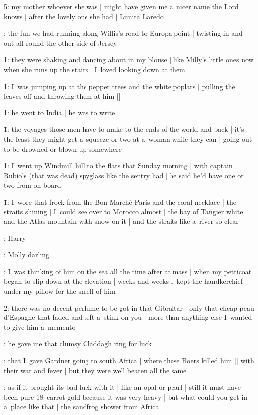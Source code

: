 \f5:
my mother whoever she was |
might have given me a~nicer name the Lord knows |
after the lovely one she had |
Lunita Laredo

:
the fun we had running along Willis's road to Europa point |
twisting in and out all round the other side of Jersey

\f1:
they were shaking and dancing about in my blouse |
like Milly's little ones now when she runs up the stairs |
I~loved looking down at them

\f1:
I~was jumping up at the pepper trees and the white poplars |
pulling the leaves off and throwing them at him [\mulvey]

\f1:
he went to India |
he was to write

\f1:
the voyages those men have to make to the ends of the world and back |
it's the least they might get a~squeeze or two at a~woman while they can |
going out to be drowned or blown up somewhere

\f1:
I~went up Windmill hill to the flats that Sunday morning |
with captain Rubio's (that was dead) spyglass like the sentry had |
he said he'd have one or two from on board

\f1:
I~wore that frock from the Bon Marché Paris and the coral necklace |
the straits shining |
I~could see over to Morocco almost |
the bay of Tangier white and the Atlas mountain with snow on it |
and the straits like a~river so clear

:
Harry

:
Molly darling

:
I~was thinking of him on the sea all the time after at mass |
when my petticoat began to slip down at the elevation |
weeks and weeks I~kept the handkerchief under my pillow for the smell of him

\f2:
there was no decent perfume to be got in that Gibraltar |
only that cheap peau d'Espagne that faded and left a~stink on you |
more than anything else I~wanted to give him a~memento

:
he gave me that clumsy Claddagh ring for luck

:
that I~gave Gardner going to south Africa |
where those Boers killed him [\gardner] with their war and fever |
but they were well beaten all the same

:
as if it brought its bad luck with it |
like an opal or pearl |
still it must have been pure 18~carrot gold because it was very heavy |
but what could you get in a~place like that |
the sandfrog shower from Africa

